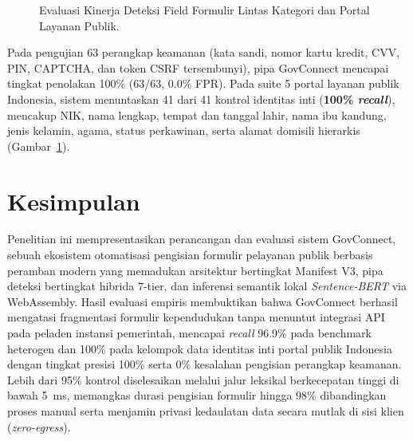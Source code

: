 \documentclass[conference]{IEEEtran}
\begin{document}
\begin{figure}[!htbp]
\centering
{}
\caption{Evaluasi Kinerja Deteksi Field Formulir Lintas Kategori dan Portal Layanan Publik.}
\label{fig:eval_accuracy}
\end{figure}

Pada pengujian 63 perangkap keamanan (kata sandi, nomor kartu kredit, CVV, PIN, CAPTCHA, dan token CSRF tersembunyi), pipa GovConnect mencapai tingkat penolakan 100\% (63/63, 0.0\% FPR). Pada suite 5 portal layanan publik Indonesia, sistem menuntaskan 41 dari 41 kontrol identitas inti (\textbf{100\% \textit{recall}}), mencakup NIK, nama lengkap, tempat dan tanggal lahir, nama ibu kandung, jenis kelamin, agama, status perkawinan, serta alamat domisili hierarkis (Gambar~\ref{fig:eval_accuracy}).

\section{Kesimpulan}

Penelitian ini mempresentasikan perancangan dan evaluasi sistem GovConnect, sebuah ekosistem otomatisasi pengisian formulir pelayanan publik berbasis peramban modern yang memadukan arsitektur bertingkat Manifest V3, pipa deteksi bertingkat hibrida 7-tier, dan inferensi semantik lokal \textit{Sentence-BERT} via WebAssembly. Hasil evaluasi empiris membuktikan bahwa GovConnect berhasil mengatasi fragmentasi formulir kependudukan tanpa menuntut integrasi API pada peladen instansi pemerintah, mencapai \textit{recall} 96.9\% pada benchmark heterogen dan 100\% pada kelompok data identitas inti portal publik Indonesia dengan tingkat presisi 100\% serta 0\% kesalahan pengisian perangkap keamanan. Lebih dari 95\% kontrol diselesaikan melalui jalur leksikal berkecepatan tinggi di bawah 5~ms, memangkas durasi pengisian formulir hingga 98\% dibandingkan proses manual serta menjamin privasi kedaulatan data secara mutlak di sisi klien (\textit{zero-egress}).
\end{document}
